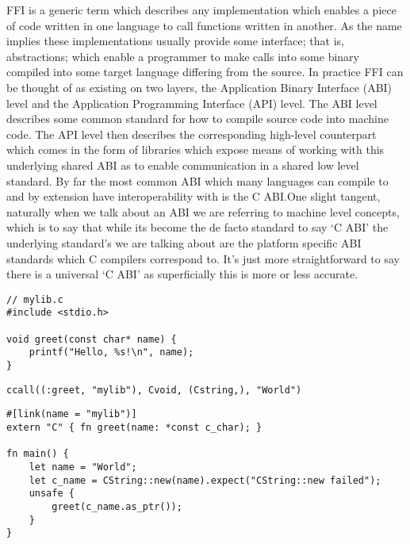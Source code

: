 \subtitle{Foreign Function Interface (FFI)}

FFI is a generic term which describes any implementation which enables a piece of code written in one language to call functions written in another. As the name implies these implementations usually provide some interface; that is, abstractions; which enable a programmer to make calls into some binary compiled into some target language differing from the source. In practice FFI can be thought of as existing on two layers, the Application Binary Interface (ABI) level and the Application Programming Interface (API) level. The ABI level describes some common standard for how to compile source code into machine code. The API level then describes the corresponding high-level counterpart which comes in the form of libraries which expose means of working with this underlying shared ABI as to enable communication in a shared low level standard. By far the most common ABI which many languages can compile to and by extension have interoperability with is the C ABI.\@ One slight tangent, naturally when we talk about an ABI we are referring to machine level concepts, which is to say that while its become the de facto standard to say `C ABI' the underlying standard's we are talking about are the platform specific ABI standards which C compilers correspond to. It's just more straightforward to say there is a universal `C ABI' as superficially this is more or less accurate.

\begin{verbatim}
// mylib.c
#include <stdio.h>

void greet(const char* name) {
    printf("Hello, %s!\n", name);
}
\end{verbatim}

\begin{verbatim}
ccall((:greet, "mylib"), Cvoid, (Cstring,), "World")
\end{verbatim}

\begin{verbatim}
#[link(name = "mylib")] 
extern "C" { fn greet(name: *const c_char); }

fn main() { 
    let name = "World"; 
    let c_name = CString::new(name).expect("CString::new failed"); 
    unsafe { 
        greet(c_name.as_ptr()); 
    } 
}
\end{verbatim}

